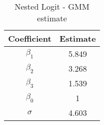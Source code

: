 \begin{table}[h!]
\centering
\caption{Nested Logit - GMM estimate}\label{tab:gmm}
\begin{tabular}{cc}
 \hline 
Coefficient & Estimate \\ \hline 
$\beta_1$ & 5.849 \\ 
$\beta_2$ & 3.268 \\ 
$\beta_3$ & 1.539 \\ 
$\beta_0$ & 1 \\ 
$\sigma$ & 4.603 \\ 
\hline
\end{tabular}
\end{table}

